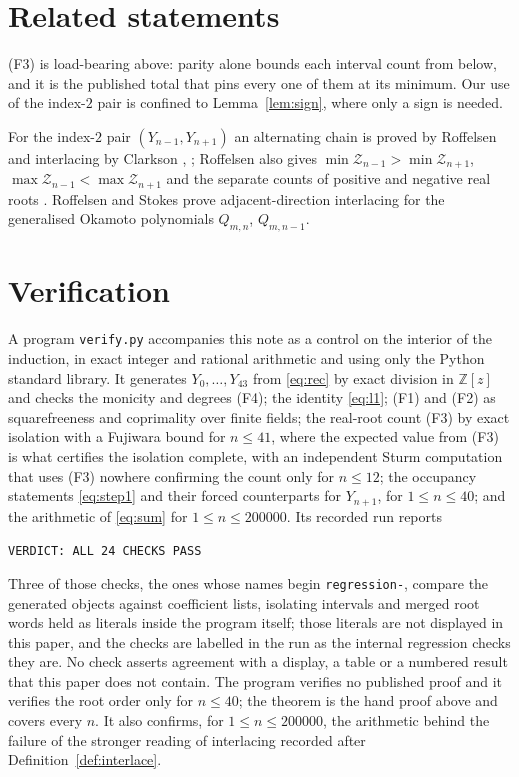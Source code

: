 \documentclass[11pt]{amsart}
\theoremstyle{definition}
\newcommand{\Zs}{\mathcal Z}
\begin{document}
\section{Related statements}

(F3) is load-bearing above: parity alone bounds each interval count from below,
and it is the published total that pins every one of them at its minimum. Our
use of the index-$2$ pair is confined to Lemma~\ref{lem:sign}, where only a sign
is needed.

For the index-$2$ pair $(Y_{n-1},Y_{n+1})$ an alternating chain is proved by
Roffelsen \cite[p.~6]{Roffelsen2012} and interlacing by Clarkson
\cite[Thm.~7.3]{ClarksonSMF}, \cite{ClarksonCMFT}; Roffelsen also gives
$\min\Zs_{n-1}>\min\Zs_{n+1}$, $\max\Zs_{n-1}<\max\Zs_{n+1}$
\cite[Thm.~2]{Roffelsen2012} and the separate counts of positive and negative
real roots \cite[Thm.~3]{Roffelsen2012}. Roffelsen and Stokes
\cite[Cor.~3.15]{RS} prove adjacent-direction interlacing for the generalised
Okamoto polynomials $Q_{m,n}$, $Q_{m,n-1}$.

\section{Verification}

A program \texttt{verify.py} accompanies this note as a control on the interior
of the induction, in exact integer and rational arithmetic and using only the
Python standard library. It generates $Y_0,\dots,Y_{43}$ from \eqref{eq:rec} by
exact division in $\mathbb Z[z]$ and checks the monicity and degrees (F4); the
identity \eqref{eq:l1}; (F1) and (F2) as squarefreeness and coprimality over
finite fields; the real-root count (F3) by exact isolation with a Fujiwara
bound for $n\le41$, where the expected value from (F3) is what certifies the
isolation complete, with an independent Sturm computation that uses (F3)
nowhere confirming the count only for $n\le12$; the occupancy statements
\eqref{eq:step1} and their forced counterparts for $Y_{n+1}$, for
$1\le n\le40$; and the arithmetic of \eqref{eq:sum} for $1\le n\le 200000$. Its
recorded run reports
\begin{center}
\texttt{VERDICT: ALL 24 CHECKS PASS}
\end{center}
Three of those checks, the ones whose names begin \texttt{regression-}, compare
the generated objects against coefficient lists, isolating intervals and merged
root words held as literals inside the program itself; those literals are not
displayed in this paper, and the checks are labelled in the run as the internal
regression checks they are. No check asserts agreement with a display, a table
or a numbered result that this paper does not contain. The program verifies no
published proof and it verifies the root order only for $n\le40$; the theorem is
the hand proof above and covers every $n$. It also confirms, for
$1\le n\le200000$, the arithmetic behind the failure of the stronger reading of
interlacing recorded after Definition~\ref{def:interlace}.
\end{document}
